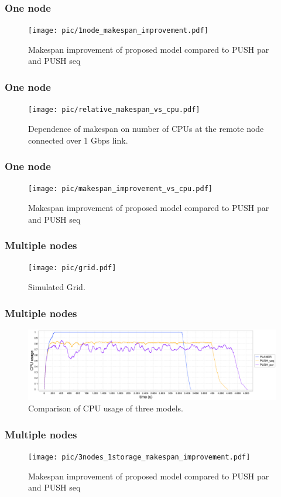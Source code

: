 \documentclass{beamer}
\begin{document}
\begin{frame}\frametitle{One node}
\begin{figure}[h]
\centering
    \texttt{[image: pic/1node\_makespan\_improvement.pdf]}
    \caption{Makespan improvement of proposed model compared to PUSH par and PUSH seq}
    \label{fig:path}
\end{figure}
\end{frame}

\begin{frame}\frametitle{One node}
\begin{figure}[h]
\centering
\texttt{[image: pic/relative\_makespan\_vs\_cpu.pdf]}

    \caption{Dependence of makespan on number of CPUs at the remote node connected over 1 Gbps link.}
\end{figure}
\end{frame}

\begin{frame}\frametitle{One node}
\begin{figure}[h]
\centering
\texttt{[image: pic/makespan\_improvement\_vs\_cpu.pdf]}
    \caption{Makespan improvement of proposed model compared to PUSH par and PUSH seq}
\end{figure}
\end{frame}

\begin{frame}\frametitle{Multiple nodes}
\begin{figure}[h]
\centering
\texttt{[image: pic/grid.pdf]}
    \caption{Simulated Grid.}
\end{figure}
\end{frame}


\begin{frame}\frametitle{Multiple nodes}
\begin{figure}[h]
\centering
 \includegraphics [trim= 0mm 00mm 0mm 00mm , clip,       	width=\textwidth]{pic/3models_link01.png}
    \caption{Comparison of CPU usage of three models. }
\end{figure}
\end{frame}


\begin{frame}\frametitle{Multiple nodes}
\begin{figure}[h]
\centering
\texttt{[image: pic/3nodes\_1storage\_makespan\_improvement.pdf]}
    \caption{Makespan improvement of proposed model compared to PUSH par and PUSH seq}
\end{figure}
\end{frame}
\end{document}
